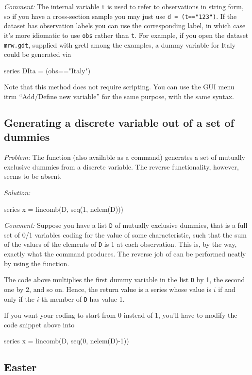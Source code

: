 \emph{Comment:} The internal variable \texttt{t} is used to refer to
observations in string form, so if you have a cross-section sample you
may just use \texttt{d = (t=="123")}. If the dataset has observation
labels you can use the corresponding label, in which case it's more
idiomatic to use \texttt{obs} rather than \texttt{t}. For example, if
you open the dataset \texttt{mrw.gdt}, supplied with gretl among the
examples, a dummy variable for Italy could be generated via
\begin{code}
  series DIta = (obs=="Italy")
\end{code}

Note that this method does not require scripting. You can use the GUI
menu itrm ``Add/Define new variable'' for the same purpose, with the
same syntax.

\subsection{Generating a discrete variable out of a set of dummies}

\emph{Problem:} The  function (also available as a
command) generates a set of mutually exclusive dummies from a discrete
variable. The reverse functionality, however, seems to be absent.

\emph{Solution:}
\begin{code}
series x = lincomb(D, seq(1, nelem(D)))
\end{code}

\emph{Comment:} Suppose you have a list \texttt{D} of mutually
exclusive dummies, that is a full set of 0/1 variables coding for the
value of some characteristic, such that the sum of the values of the
elements of \texttt{D} is 1 at each observation. This is, by the way,
exactly what the  command produces.  The reverse job of
 can be performed neatly by using the 
function.

The code above multiplies the first dummy variable in the list
\texttt{D} by 1, the second one by 2, and so on. Hence, the return
value is a series whose value is $i$ if and only if the $i$-th member
of \texttt{D} has value 1.

If you want your coding to start from 0 instead of 1, you'll have to
modify the code snippet above into
\begin{code}
series x = lincomb(D, seq(0, nelem(D)-1))
\end{code}

\subsection{Easter}

